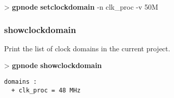\documentclass[10pt,a4paper]{article}
\begin{document}
\begin{sampletitle}
> \textbf{gpnode} \textbf{setclockdomain} -n clk\_proc -v 50M
\end{sampletitle}


\subsubsection{showclockdomain}

Print the list of clock domains in the current project.

\begin{sampletitle}
> \textbf{gpnode} \textbf{showclockdomain}
\begin{Verbatim}
domains :
  + clk_proc = 48 MHz
\end{Verbatim}
\end{sampletitle}

\end{document}
